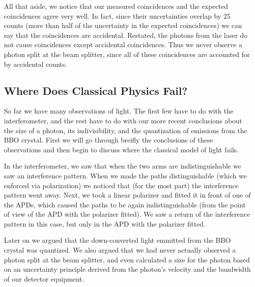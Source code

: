 \documentclass{article}
\begin{document}
All that aside, we notice that our measured coincidences and the expected coincidences agree very well.  In fact, since their uncertainties overlap by 25 counts (more than half of the uncertainty in the expected coincidences) we can say that the coincidences are accidental.  Restated, the photons from the laser do not cause coincidences except accidental coincidences.  Thus we never observe a photon split at the beam splitter, since all of these coincidences are accounted for by accidental counts.

\subsection{Where Does Classical Physics Fail?}

So far we have many observations of light.  The first few have to do with the interferometer, and the rest have to do with our more recent conclusions about the size of a photon, its indivisibility, and the quantization of emissions from the BBO crystal.  First we will go through breifly the conclusions of these observations and then begin to discuss where the classical model of light fails.

\hspace{.25cm}

In the interferometer, we saw that when the two arms are indistinguishable we saw an interference pattern.  When we made the paths distinguishable (which we enforced via polarization) we noticed that (for the most part) the interference pattern went away.  Next, we took a linear polarizer and fitted it in front of one of the APDs, which caused the paths to be again indistinguishable (from the point of view of the APD with the polarizer fitted).  We saw a return of the interference pattern in this case, but only in the APD with the polarizer fitted.

\hspace{.25cm}

Later on we argued that the down-converted light emmitted from the BBO crystal was quantized.  We also argued that we had never actually observed a photon split at the beam splitter, and even calculated a size for the photon based on an uncertainty principle derived from the photon's velocity and the bandwidth of our detector equipment.

\hspace{.25cm}
\end{document}
